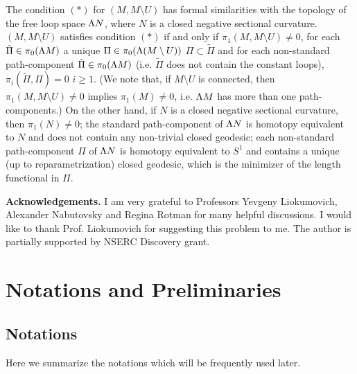 \documentclass[11pt,twoside]{article}
\begin{document}
The condition $(*)$ for $(M,M\setminus U)$ has formal similarities with the topology of the free loop space $\Lambda N$, where $N$ is a closed \Rm \mf \w negative sectional curvature. $(M,M\setminus U)$ satisfies condition $(*)$ if and only if $\pi_1(M, M\setminus U)\neq 0$, for each $\tilde{\Pi}\in \pi_0(\Lambda M)$ \tes a unique $\Pi\in \pi_0(\Lambda (M\setminus U))$ \st \(\Pi\subset \tilde{\Pi}\) and for each non-standard path-component $\tilde{\Pi}\in \pi_0(\Lambda M)$ (i.e. $\tilde{\Pi}$ does not contain the constant loops), $\pi_i(\tilde{\Pi}, \Pi)=0$ \fa $i\geq 1$. (We note that, if $M\setminus U$ is connected, then $\pi_1(M, M\setminus U)\neq 0$ implies $\pi_1(M)\neq 0$, i.e. $\Lambda M$ has more than one path-components.) On the other hand, if $N$ is a closed \Rm \mf \w negative sectional curvature, then $\pi_1(N)\neq 0$; the standard path-component of $\Lambda N$ is homotopy equivalent to $N$ and does not contain any non-trivial closed geodesic; each non-standard path-component $\Pi$ of $\Lambda N$ is homotopy equivalent to $S^1$ and contains a unique (up to reparametrization) closed geodesic, which is the minimizer of the length functional in $\Pi$.

\noindent\textbf{Acknowledgements.} I am very grateful to  Professors Yevgeny Liokumovich, Alexander Nabutovsky and Regina Rotman for many helpful discussions. I would like to thank Prof. Liokumovich for suggesting this problem to me. The author is partially supported by NSERC Discovery grant.

\section{Notations and Preliminaries}
\subsection{Notations}\label{s.notn}
Here we summarize the notations which will be frequently used later.
\end{document}
